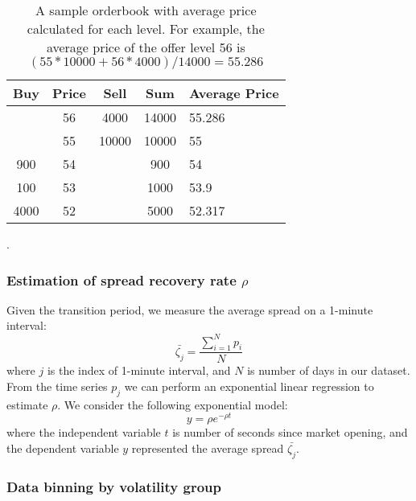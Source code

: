 \begin{table}[h]
  \centering
  \begin{tabular}{c|c|c|c|l}
    \hline
    \textbf{Buy} & \textbf{Price} & \textbf{Sell} & \textbf{Sum} & \multicolumn{1}{c}{\textbf{Average Price}} \\ \hline
                 & 56             & 4000          & 14000        & 55.286                                     \\ \hline
                 & 55             & 10000         & 10000        & 55                                         \\ \hline
    900          & 54             &               & 900          & 54                                         \\ \hline
    100          & 53             &               & 1000         & 53.9                                       \\ \hline
    4000         & 52             &               & 5000         & 52.317                                     \\ \hline
  \end{tabular}
  \caption{A sample orderbook with average price calculated for each level. For example, the average price of the offer level 56 is $(55*10000+56*4000)/14000 = 55.286$}.
  \label{tbl:bookAvgPxConversion}
\end{table}

\subsubsection{Estimation of spread recovery rate $\rho$}

Given the transition period, we measure the average spread on a 1-minute interval:
\[
  \bar{\zeta_j} = \frac{\sum_{i=1}^N p_i}{N}
\]
where $j$ is the index of 1-minute interval, and $N$ is number of days in our dataset. From the time series $p_j$ we can perform an exponential linear regression to estimate $\rho$. We consider the following exponential model:
\[
  y = \rho e^{-\rho t}
\]
where the independent variable $t$ is number of seconds since market opening, and the dependent variable $y$ represented the average spread $\bar{\zeta_j}$.

\subsubsection{Data binning by volatility group}

